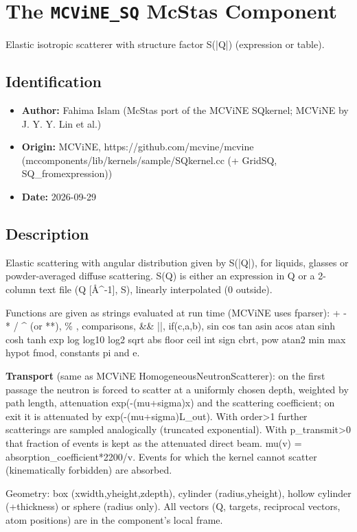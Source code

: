 \section{The \texttt{MCViNE\_SQ} McStas Component}
Elastic isotropic scatterer with structure factor S(|Q|) (expression or table).

\subsection*{Identification}
\begin{itemize}
  \item \textbf{Author:} Fahima Islam (McStas port of the MCViNE SQkernel; MCViNE by J. Y. Y. Lin et al.)
  \item \textbf{Origin:} MCViNE, https://github.com/mcvine/mcvine (mccomponents/lib/kernels/sample/SQkernel.cc (+ GridSQ, SQ\_fromexpression))
  \item \textbf{Date:} 2026-09-29
\end{itemize}

\subsection*{Description}
Elastic scattering with angular distribution given by S(|Q|), for liquids, glasses or powder-averaged diffuse scattering. S(Q) is either an expression in Q or a 2-column text file (Q [\AA{}\textasciicircum{}-1], S), linearly interpolated (0 outside).

Functions are given as strings evaluated at run time (MCViNE uses fparser): + - * / \textasciicircum{} (or **), \% , comparisons, \&\& ||, if(c,a,b), sin cos tan asin acos atan sinh cosh tanh exp log log10 log2 sqrt abs floor ceil int sign cbrt, pow atan2 min max hypot fmod, constants pi and e.

\textbf{Transport} (same as MCViNE HomogeneousNeutronScatterer): on the first passage the neutron is forced to scatter at a uniformly chosen depth, weighted by path length, attenuation exp(-(mu+sigma)x) and the scattering coefficient; on exit it is attenuated by exp(-(mu+sigma)L\_out). With order\textgreater{}1 further scatterings are sampled analogically (truncated exponential). With p\_transmit\textgreater{}0 that fraction of events is kept as the attenuated direct beam. mu(v) = absorption\_coefficient*2200/v. Events for which the kernel cannot scatter (kinematically forbidden) are absorbed.

Geometry: box (xwidth,yheight,zdepth), cylinder (radius,yheight), hollow cylinder (+thickness) or sphere (radius only). All vectors (Q, targets, reciprocal vectors, atom positions) are in the component's local frame.

